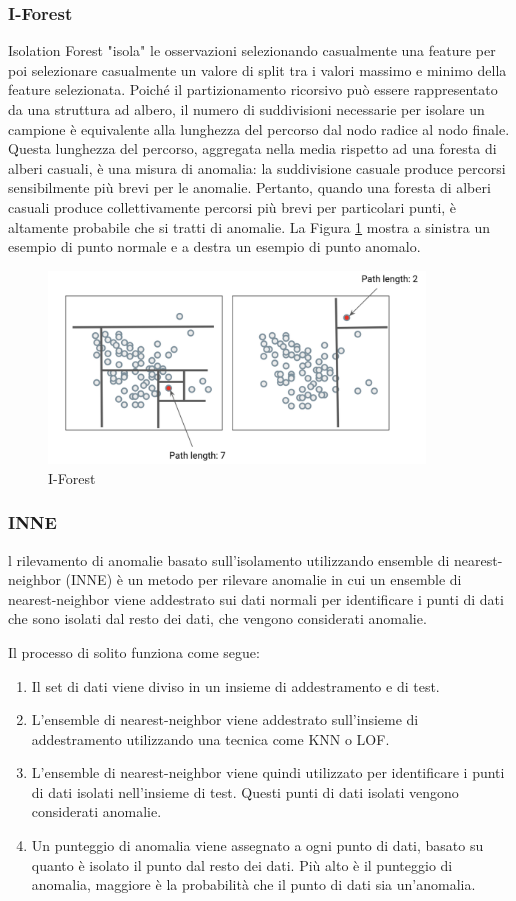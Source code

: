\subsubsection{I-Forest}
Isolation Forest \cite{liu2008isolation, liu2012isolation} "isola" le osservazioni selezionando casualmente una feature per poi selezionare casualmente un valore di split tra i valori massimo e minimo della feature selezionata. 
Poiché il partizionamento ricorsivo può essere rappresentato da una struttura ad albero, il numero di suddivisioni necessarie per isolare un campione è equivalente alla lunghezza del percorso dal nodo radice al nodo finale.
Questa lunghezza del percorso, aggregata nella media rispetto ad una foresta di alberi casuali, è una misura di anomalia: la suddivisione casuale produce percorsi sensibilmente più brevi per le anomalie. Pertanto, quando una foresta di alberi casuali produce collettivamente percorsi più brevi per particolari punti, è altamente probabile che si tratti di anomalie.
La Figura \ref{iforest} mostra a sinistra un esempio di punto normale e a destra un esempio di punto anomalo.
\begin{figure}[t]
	\centering
	\includegraphics[width=10cm, scale=1]{images/iforest}
	\caption{I-Forest}
	\label{iforest}
\end{figure}
\subsubsection{INNE}
l rilevamento di anomalie basato sull'isolamento utilizzando ensemble di nearest-neighbor (INNE) \cite{bandaragoda2018isolation} è un metodo per rilevare anomalie in cui un ensemble di nearest-neighbor viene addestrato sui dati normali per identificare i punti di dati che sono isolati dal resto dei dati, che vengono considerati anomalie.

Il processo di solito funziona come segue:
\begin{enumerate}
\item Il set di dati viene diviso in un insieme di addestramento e di test.
\item L'ensemble di nearest-neighbor viene addestrato sull'insieme di addestramento utilizzando una tecnica come KNN o LOF.
\item L'ensemble di nearest-neighbor viene quindi utilizzato per identificare i punti di dati isolati nell'insieme di test. Questi punti di dati isolati vengono considerati anomalie.
\item Un punteggio di anomalia viene assegnato a ogni punto di dati, basato su quanto è isolato il punto dal resto dei dati. Più alto è il punteggio di anomalia, maggiore è la probabilità che il punto di dati sia un'anomalia.
\end{enumerate}

